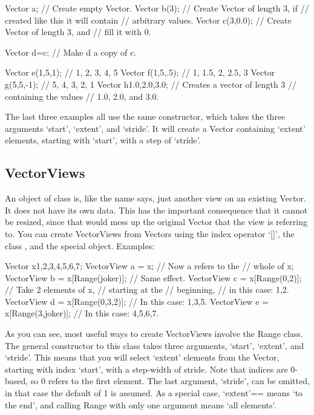 \begin{code}
Vector a;         // Create empty Vector.
Vector b(3);      // Create Vector of length 3, if
                  // created like this it will contain
                  // arbitrary values.
Vector c(3,0.0);  // Create Vector of length 3, and
                  // fill it with 0.

Vector d=c;       // Make d a copy of c.

Vector e(1,5,1);  // 1, 2, 3, 4, 5
Vector f(1,5,.5); // 1, 1.5, 2, 2.5, 3
Vector g(5,5,-1); // 5, 4, 3, 2, 1
Vector h{1.0,2.0,3.0};  // Creates a vector of length 3
                        // containing the values
                        // 1.0, 2.0, and 3.0.
\end{code}

The last three examples all use the same constructor, which takes
the three arguments `start', `extent', and `stride'. It will create a
Vector containing `extent' elements, starting with `start', with a
step of `stride'.

\subsection{VectorViews}
\label{sec:vector_views}

An object of class  is, like the name says, just
another view on an existing Vector. It does not have its own
data. This has the important consequence that it cannot be resized,
since that would mess up the original Vector that the view is
referring to. You can create VectorViews from Vectors using the index
operator `[]', the class , and the special 
object. Examples:

\begin{code}
Vector x{1,2,3,4,5,6,7};
VectorView a = x;                 // Now a refers to the 
                                  // whole of x;
VectorView b = x[Range(joker)];   // Same effect.
VectorView c = x[Range(0,2)];     // Take 2 elements of x, 
                                  // starting at the 
                                  // beginning,
                                  // in this case: 1,2.
VectorView d = x[Range(0,3,2)];   // In this case: 1,3,5.
VectorView e = x[Range(3,joker)]; // In this case: 4,5,6,7.
\end{code}

As you can see, most useful ways to create VectorViews involve the
Range class. The general constructor to this class takes three
arguments, `start', `extent', and `stride'. This means that you will
select `extent' elements from the Vector, starting with index `start',
with a step-width of stride. Note that indices are 0-based, so 0
refers to the first element. The last argument, `stride', can be
omitted, in that case the default of 1 is assumed. As a special case,
`extent'== means `to the end', and calling Range with only one
argument  means `all elements'.

